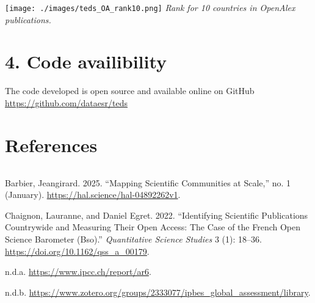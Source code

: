 \documentclass[
]{article}
\newlength{\cslhangindent}
\newenvironment{cslreferences}%
  {\setlength{\parindent}{0pt}%
  \everypar{\setlength{\hangindent}{\cslhangindent}}\ignorespaces}%
  {\par}
\begin{document}
\texttt{[image: ./images/teds\_OA\_rank10.png]} \emph{Rank for 10
countries in OpenAlex publications.}

\hypertarget{code-availibility}{%
\section{4. Code availibility}\label{code-availibility}}

The code developed is open source and available online on GitHub
\url{https://github.com/dataesr/teds}

\hypertarget{references}{%
\section{References}\label{references}}

\begin{verbatim}
\end{verbatim}

\hypertarget{refs}{}
\begin{cslreferences}
\leavevmode\hypertarget{ref-hal-04892262}{}%
Barbier, Jeangirard. 2025. ``Mapping Scientific Communities at Scale,''
no. 1 (January). \url{https://hal.science/hal-04892262v1}.

\leavevmode\hypertarget{ref-10.1162ux2fqss_a_00179}{}%
Chaignon, Lauranne, and Daniel Egret. 2022. ``Identifying Scientific
Publications Countrywide and Measuring Their Open Access: The Case of
the French Open Science Barometer (Bso).'' \emph{Quantitative Science
Studies} 3 (1): 18--36. \url{https://doi.org/10.1162/qss_a_00179}.

\leavevmode\hypertarget{ref-ipccbibliography}{}%
n.d.a. \url{https://www.ipcc.ch/report/ar6}.

\leavevmode\hypertarget{ref-ipbesbibliography}{}%
n.d.b.
\url{https://www.zotero.org/groups/2333077/ipbes_global_assessment/library}.
\end{cslreferences}
\end{document}
